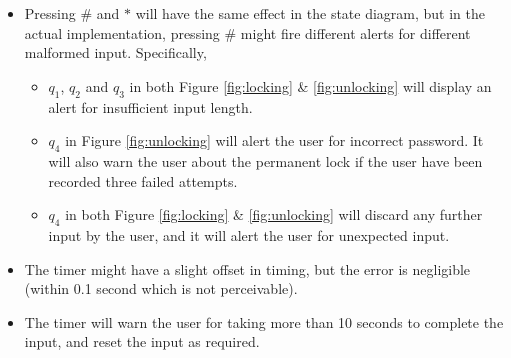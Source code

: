 \documentclass[12pt]{article}
\begin{document}
\begin{itemize}
  \item Pressing $\#$ and $*$ will have the same effect in the state diagram, but in the actual implementation, pressing $\#$ might fire different alerts for different malformed input. Specifically,
  \begin{itemize}
    \item $q_1$, $q_2$ and $q_3$ in both Figure \ref{fig:locking} \& \ref{fig:unlocking} will display an alert for insufficient input length.
    \item $q_4$ in Figure \ref{fig:unlocking} will alert the user for incorrect password. It will also warn the user about the permanent lock if the user have been recorded three failed attempts.
    \item $q_4$ in both Figure \ref{fig:locking} \& \ref{fig:unlocking} will discard any further input by the user, and it will alert the user for unexpected input.
  \end{itemize}
  \item The timer might have a slight offset in timing, but the error is negligible (within 0.1 second which is not perceivable).
  \item The timer will warn the user for taking more than 10 seconds to complete the input, and reset the input as required.
\end{itemize}
\end{document}
